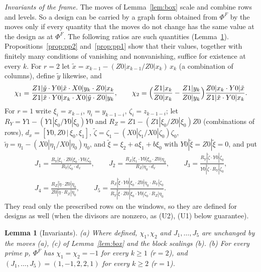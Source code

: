 \documentclass[11pt]{amsart}
\newtheorem{lemma}[theorem]{Lemma}
\theoremstyle{definition}
\theoremstyle{plain}
\begin{document}
\smallskip\noindent\emph{Invariants of the frame.} The moves of Lemma~\ref{lem:box} scale and combine rows and levels. So a design can be carried by a graph form obtained from $\Phi^F$ by the moves only if every quantity that the moves do not change has the same value at the design as at $\Phi^F$. The following ratios are such quantities (Lemma~\ref{lem:ppinv}). Propositions~\ref{prop:pp2} and~\ref{prop:pp1} show that their values, together with finitely many conditions of vanishing and nonvanishing, suffice for existence at every $k$. For $r=2$ let $\tilde x=x_{k-1}-(Z0|x_{k-1}/Z0|x_k)\,x_k$ (a combination of columns), define $\tilde y$ likewise, and
\[
\chi_1=\frac{Z1|\tilde y\cdot Y0|\tilde x\cdot X0|y_k\cdot Z0|x_k}{Z1|\tilde x\cdot Y0|x_k\cdot X0|\tilde y\cdot Z0|y_k},\qquad
\chi_2=\Bigl(\frac{Z1|x_k}{Z0|x_k}-\frac{Z1|y_k}{Z0|y_k}\Bigr)\frac{Z0|x_k\cdot Y0|\tilde x}{Z1|\tilde x\cdot Y0|x_k}.
\]
For $r=1$ write $\xi_i=x_{k-i}$, $\eta_i=y_{k-1-i}$, $\zeta_i=z_{k-1-i}$; let $R_Y=Y1-(Y1|\xi_0/Y0|\xi_0)Y0$ and $R_Z=Z1-(Z1|\xi_0/Z0|\xi_0)Z0$ (combinations of rows), $d_x=[Y0,Z0\,|\allowbreak\,\xi_0,\xi_1]$, $\tilde\zeta=\zeta_1-(X0|\zeta_1/X0|\zeta_0)\zeta_0$, $\tilde\eta=\eta_1-(X0|\eta_1/X0|\eta_0)\eta_0$, and $\tilde\xi=\xi_2+a\xi_1+b\xi_0$ with $Y0|\tilde\xi=Z0|\tilde\xi=0$, and put
\begin{gather*}
J_1=\frac{R_Y|\xi_1\cdot Z0|\xi_0\cdot Y0|\zeta_0}{R_Y|\zeta_0\cdot d_x},\qquad
J_2=\frac{R_Z|\xi_1\cdot Y0|\xi_0\cdot Z0|\eta_0}{R_Z|\eta_0\cdot d_x},\qquad
J_3=\frac{R_Y|\tilde\zeta\cdot Y0|\zeta_0}{Y0|\tilde\zeta\cdot R_Y|\zeta_0},\\
J_4=\frac{R_Z|\tilde\eta\cdot Z0|\eta_0}{Z0|\tilde\eta\cdot R_Z|\eta_0},\qquad
J_5=\frac{R_Z|\tilde\xi\cdot Y0|\xi_0\cdot Z0|\eta_0\cdot R_Y|\zeta_0}{R_Y|\tilde\xi\cdot Z0|\xi_0\cdot Y0|\zeta_0\cdot R_Z|\eta_0}.
\end{gather*}
They read only the prescribed rows on the windows, so they are defined for designs as well (when the divisors are nonzero, as (U2), (U1) below guarantee).

\begin{lemma}[Invariants]\label{lem:ppinv}
(a) Where defined, $\chi_1,\chi_2$ and $J_1,\dots,J_5$ are unchanged by the moves (a), (c) of Lemma~\ref{lem:box} and the block scalings (b).
(b) For every prime $p$, $\Phi^F$ has $\chi_1=\chi_2=-1$ for every $k\ge1$ ($r=2$), and $(J_1,\dots,J_5)=(1,-1,2,2,1)$ for every $k\ge2$ ($r=1$).
\end{lemma}
\end{document}
